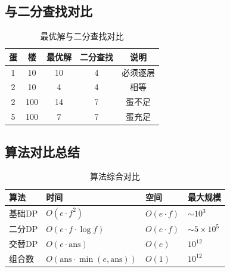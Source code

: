 \documentclass[12pt,a4paper]{article}
\begin{document}
\subsection*{与二分查找对比}

\begin{table}[H]
\centering
\caption{最优解与二分查找对比}
\begin{tabular}{@{}ccccc@{}}
\toprule
\textbf{蛋} & \textbf{楼} & \textbf{最优解} & \textbf{二分查找} & \textbf{说明} \\
\midrule
1 & 10 & 10 & 4 & 必须逐层 \\
2 & 10 & 4 & 4 & 相等 \\
2 & 100 & 14 & 7 & 蛋不足 \\
5 & 100 & 7 & 7 & 蛋充足 \\
\bottomrule
\end{tabular}
\end{table}

\subsection*{算法对比总结}

\begin{table}[H]
\centering
\caption{算法综合对比}
\begin{tabular}{@{}llll@{}}
\toprule
\textbf{算法} & \textbf{时间} & \textbf{空间} & \textbf{最大规模} \\
\midrule
基础DP & $O(e \cdot f^2)$ & $O(e \cdot f)$ & $\sim10^3$ \\
二分DP & $O(e \cdot f \cdot \log f)$ & $O(e \cdot f)$ & $\sim5\times10^5$ \\
交替DP & $O(e \cdot \mathrm{ans})$ & $O(e)$ & $10^{12}$ \\
组合数 & $O(\mathrm{ans} \cdot \min(e,\mathrm{ans}))$ & $O(1)$ & $10^{12}$ \\
\bottomrule
\end{tabular}
\end{table}
\end{document}

